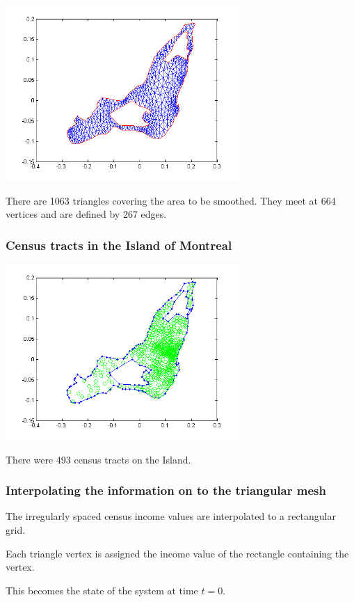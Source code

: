 \documentclass[11pt]{beamer}
\begin{document}

\begin{frame}


\includegraphics[width=3.5in]{figs/mtl_mesh.png}

There are 1063 triangles covering the area to be smoothed. They
meet at 664 vertices and are defined by 267 edges.

\end{frame}


\begin{frame}

\frametitle{Census tracts in the Island of Montreal}

\includegraphics[width=3.5in]{figs/mtlcensus.png}

There were 493 census tracts on the Island.

\end{frame}


\begin{frame}


\frametitle{Interpolating the information on to the triangular mesh}

\bi
  \item The irregularly spaced census income values are
  interpolated to a rectangular grid.
  \item Each triangle vertex is assigned the income value of
  the rectangle containing the vertex.
  \item This becomes the state of the system at time $t = 0.$
\ei

\end{frame}
\end{document}
